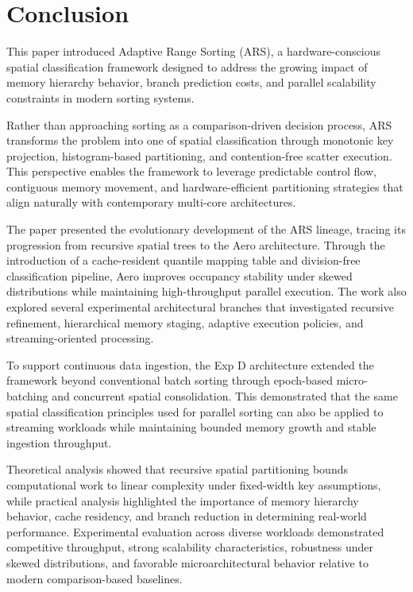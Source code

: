 \section{Conclusion}
This paper introduced Adaptive Range Sorting (ARS), a hardware-conscious spatial classification framework designed to address the growing impact of memory hierarchy behavior, branch prediction costs, and parallel scalability constraints in modern sorting systems.

Rather than approaching sorting as a comparison-driven decision process, ARS transforms the problem into one of spatial classification through monotonic key projection, histogram-based partitioning, and contention-free scatter execution.
This perspective enables the framework to leverage predictable control flow, contiguous memory movement, and hardware-efficient partitioning strategies that align naturally with contemporary multi-core architectures.

The paper presented the evolutionary development of the ARS lineage, tracing its progression from recursive spatial trees to the Aero architecture.
Through the introduction of a cache-resident quantile mapping table and division-free classification pipeline, Aero improves occupancy stability under skewed distributions while maintaining high-throughput parallel execution.
The work also explored several experimental architectural branches that investigated recursive refinement, hierarchical memory staging, adaptive execution policies, and streaming-oriented processing.

To support continuous data ingestion, the Exp D architecture extended the framework beyond conventional batch sorting through epoch-based micro-batching and concurrent spatial consolidation.
This demonstrated that the same spatial classification principles used for parallel sorting can also be applied to streaming workloads while maintaining bounded memory growth and stable ingestion throughput.

Theoretical analysis showed that recursive spatial partitioning bounds computational work to linear complexity under fixed-width key assumptions, while practical analysis highlighted the importance of memory hierarchy behavior, cache residency, and branch reduction in determining real-world performance.
Experimental evaluation across diverse workloads demonstrated competitive throughput, strong scalability characteristics, robustness under skewed distributions, and favorable microarchitectural behavior relative to modern comparison-based baselines.


